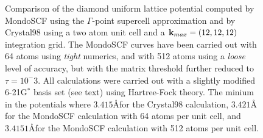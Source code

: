 \documentclass[prb,aps,nobibnotes,twocolumn,doublespace,twocolumngrid,superbib]{revtex4}
\begin{document}
\begin{figure}[p]
\caption{Comparison of the diamond uniform lattice potential computed 
by MondoSCF using the $\Gamma$-point supercell approximation and by {\sc Crystal98}
using a two atom unit cell and a ${\bf k}_{max} = (12,12,12)$ integration grid.
The {\sc MondoSCF} curves have been carried out with 64 atoms using {\it tight}
numerics, and with 512 atoms using a {\it loose} level of accuracy, but with the matrix
threshold further reduced to $\tau=10^-3$.  
All calculations were carried out with a slightly 
modified 6-21G$^*$ basis set (see text) using Hartree-Fock theory.
The minium in the potentials where $3.415$\AA for the {\sc Crystal98} calculation, $3.421$\AA 
for the {\sc MondoSCF} calculation with 64 atoms per unit cell, and  $3.4151$\AA  for the
{\sc MondoSCF} calculation with 512 atoms per unit cell. }
\label{CarbonEnergyVsLattice}
\end{figure}
\end{document}
